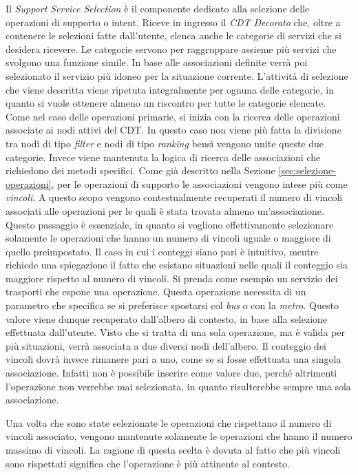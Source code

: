 Il \emph{Support Service Selection} è il componente dedicato alla selezione delle operazioni di supporto o intent. Riceve in ingresso il \emph{CDT Decorato} che, oltre a contenere le selezioni fatte dall'utente, elenca anche le categorie di servizi che si desidera ricevere. Le categorie servono per raggruppare assieme più servizi che svolgono una funzione simile. In base alle associazioni definite verrà poi selezionato il servizio più idoneo per la situazione corrente. L'attività di selezione che viene descritta viene ripetuta integralmente per ognuna delle categorie, in quanto si vuole ottenere almeno un riscontro per tutte le categorie elencate. Come nel caso delle operazioni primarie, si inizia con la ricerca delle operazioni associate ai nodi attivi del CDT. In questo caso non viene più fatta la divisione tra nodi di tipo \emph{filter} e nodi di tipo \emph{ranking} bensì vengono unite queste due categorie. Invece viene mantenuta la logica di ricerca delle associazioni che richiedono dei metodi specifici. Come già descritto nella Sezione \ref{sec:selezione-operazioni}, per le operazioni di supporto le associazioni vengono intese più come \emph{vincoli}. A questo scopo vengono contestualmente recuperati il numero di vincoli associati alle operazioni per le quali è stata trovata almeno un'associazione. Questo passaggio è essenziale, in quanto si vogliono effettivamente selezionare solamente le operazioni che hanno un numero di vincoli uguale o maggiore di quello preimpostato. Il caso in cui i conteggi siano pari è intuitivo, mentre richiede una spiegazione il fatto che esistano situazioni nelle quali il conteggio sia maggiore rispetto al numero di vincoli. Si prenda come esempio un servizio dei trasporti che espone una operazione. Questa operazione necessita di un parametro che specifica se si preferisce spostarsi col \emph{bus} o con la \emph{metro}. Questo valore viene dunque recuperato dall'albero di contesto, in base alla selezione effettuata dall'utente. Visto che si tratta di una sola operazione, ma è valida per più situazioni, verrà associata a due diversi nodi dell'albero. Il conteggio dei vincoli dovrà invece rimanere pari a uno, come se si fosse effettuata una singola associazione. Infatti non è possibile inserire come valore due, perché altrimenti l'operazione non verrebbe mai selezionata, in quanto risulterebbe sempre una sola associazione.

Una volta che sono state selezionate le operazioni che rispettano il numero di vincoli associato, vengono mantenute solamente le operazioni che hanno il numero massimo di vincoli. La ragione di questa scelta è dovuta al fatto che più vincoli sono rispettati significa che l'operazione è più attinente al contesto.

